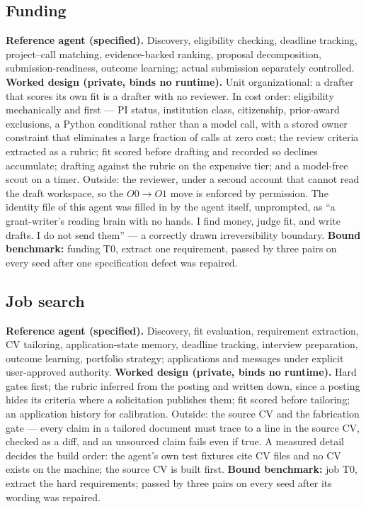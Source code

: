 \subsection{Funding}

\textbf{Reference agent (specified).} Discovery, eligibility checking, deadline tracking, project--call matching, evidence-backed ranking, proposal decomposition, submission-readiness, outcome learning; actual submission separately controlled. \textbf{Worked design (private, binds no runtime).} Unit organizational: a drafter that scores its own fit is a drafter with no reviewer. In cost order: eligibility mechanically and first --- PI status, institution class, citizenship, prior-award exclusions, a Python conditional rather than a model call, with a stored owner constraint that eliminates a large fraction of calls at zero cost; the review criteria extracted as a rubric; fit scored before drafting and recorded so declines accumulate; drafting against the rubric on the expensive tier; and a model-free scout on a timer. Outside: the reviewer, under a second account that cannot read the draft workspace, so the $O0 \to O1$ move is enforced by permission. The identity file of this agent was filled in by the agent itself, unprompted, as ``a grant-writer's reading brain with no hands. I find money, judge fit, and write drafts. I do not send them'' --- a correctly drawn irreversibility boundary. \textbf{Bound benchmark:} funding T0, extract one requirement, passed by three pairs on every seed after one specification defect was repaired.

\subsection{Job search}

\textbf{Reference agent (specified).} Discovery, fit evaluation, requirement extraction, CV tailoring, application-state memory, deadline tracking, interview preparation, outcome learning, portfolio strategy; applications and messages under explicit user-approved authority. \textbf{Worked design (private, binds no runtime).} Hard gates first; the rubric inferred from the posting and written down, since a posting hides its criteria where a solicitation publishes them; fit scored before tailoring; an application history for calibration. Outside: the source CV and the fabrication gate --- every claim in a tailored document must trace to a line in the source CV, checked as a diff, and an unsourced claim fails even if true. A measured detail decides the build order: the agent's own test fixtures cite CV files and no CV exists on the machine; the source CV is built first. \textbf{Bound benchmark:} job T0, extract the hard requirements; passed by three pairs on every seed after its wording was repaired.

